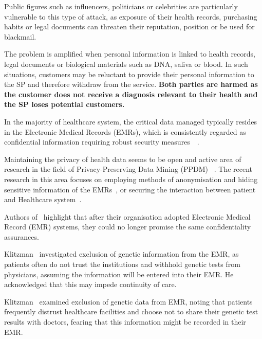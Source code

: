 \documentclass[pdftex,twocolumn,epjc3]{svjour3}
\begin{document}
Public figures such as influencers, politicians or celebrities are particularly vulnerable to this type of attack, as exposure of their health records, purchasing habits or legal documents can threaten their reputation, position or be used for blackmail.

The problem is amplified when personal information is linked to health records, legal documents or biological materials such as DNA, saliva or blood. In such situations, customers may be reluctant to provide their personal information to the SP and therefore withdraw from the service.  \textbf{Both parties are harmed as the customer does not receive a diagnosis relevant to their health and the SP loses potential customers.}~\cite{klitzmanExclusionGeneticInformation2010,blackPresymptomaticTestingConfidentiality2021}

In the majority of healthcare system, the critical data managed typically resides in the Electronic Medical Records (EMRs), which is consistently regarded as confidential information requiring robust security measures~\cite{jinReviewSecurePrivacypreserving2019}~\cite{keshtaSecurityPrivacyElectronic2021}. 

Maintaining the privacy of health data seems to be open and active area of research in the field of Privacy-Preserving Data Mining (PPDM) ~\cite{nareshPrivacyPreservingData2023,linPPSFOpensourcePrivacypreserving2018,hewagePrivacypreservingDataStream2023}. The recent research in this area focuses on employing methods of anonymisation and hiding sensitive information of the EMRs~\cite{hamdiEnhancingSecurityPrivacy2023, sharmaPrivacyPreservingData2019, wuHidingSensitiveInformation2021}, or securing the interaction between patient and Healthcare system~\cite{zhangPrivacyProtectionTelecare2016, mehmoodAnonymousAuthenticationScheme2018, khasimImprovedFastSecure2022}.

Authors of~\cite{blackPresymptomaticTestingConfidentiality2021} highlight that after their organisation adopted Electronic Medical Record (EMR) systems, they could no longer promise the same confidentiality assurances.

Klitzman~\cite{klitzmanExclusionGeneticInformation2010} investigated exclusion of genetic information from the EMR, as patients often do not trust the institutions and withhold genetic tests from physicians, assuming the information will be entered into their EMR. He acknowledged that this may impede continuity of care.

Klitzman~\cite{klitzmanExclusionGeneticInformation2010} examined exclusion of genetic data from EMR, noting that patients frequently distrust healthcare facilities and choose not to share their genetic test results with doctors, fearing that this information might be recorded in their EMR.
 
\end{document}
